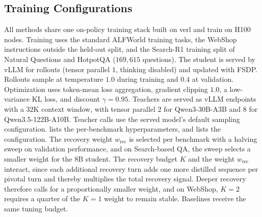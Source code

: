 \subsection{Training Configurations}
\label{app:hyperparameters}

All methods share one on-policy training stack built on verl and train on H100 nodes. Training uses the standard ALFWorld training tasks, the WebShop instructions outside the held-out split, and the Search-R1 training split of Natural Questions and HotpotQA ($169{,}615$ questions). The student is served by vLLM for rollouts (tensor parallel $1$, thinking disabled) and updated with FSDP. Rollouts sample at temperature $1.0$ during training and $0.4$ at validation. Optimization uses token-mean loss aggregation, gradient clipping $1.0$, a low-variance KL loss, and discount $\gamma=0.95$. Teachers are served as vLLM endpoints with a $32$K context window, with tensor parallel $2$ for Qwen3-30B-A3B and $8$ for Qwen3.5-122B-A10B. Teacher calls use the served model's default sampling configuration.  lists the per-benchmark hyperparameters, and  lists the \method{} configuration. The recovery weight $w_\text{rec}$ is selected per benchmark with a halving sweep on validation performance, and on Search-based QA, the sweep selects a smaller weight for the 8B student. The recovery budget $K$ and the weight $w_\text{rec}$ interact, since each additional recovery turn adds one more distilled sequence per pivotal turn and thereby multiplies the total recovery signal. Deeper recovery therefore calls for a proportionally smaller weight, and on WebShop, $K=2$ requires a quarter of the $K=1$ weight to remain stable. Baselines receive the same tuning budget.

